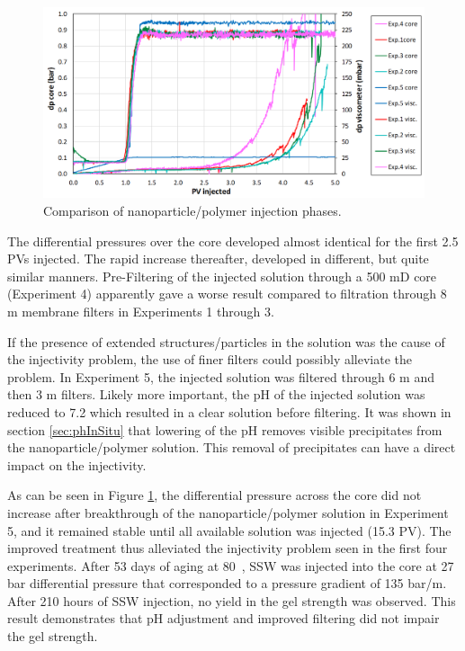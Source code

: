 \begin{figure}[h!]
    \centering
    \includegraphics[width=\textwidth]{img/cht/gelexp_sum.png}
    \caption{Comparison of nanoparticle/polymer injection phases.}
    \label{cht:gelexp_sum} %
\end{figure}
 
The differential pressures over the core developed almost identical for the first 2.5 PVs injected. The rapid increase thereafter, developed in different, but quite similar manners. Pre-Filtering of the injected solution through a 500 mD core (Experiment 4) apparently gave a worse result compared to filtration through 8 \micro m membrane filters in Experiments 1 through 3.

If the presence of extended structures/particles in the solution was the cause of the injectivity problem, the use of finer filters could possibly alleviate the problem. In Experiment 5, the injected solution was filtered through 6 \micro m and then 3 \micro m filters. Likely more important, the pH of the injected solution was reduced to 7.2 which resulted in a clear solution before filtering. It was shown in section \ref{sec:phInSitu} that lowering of the pH removes visible precipitates from the nanoparticle/polymer solution. This removal of precipitates can have a direct impact on the injectivity. 

As can be seen in Figure \ref{cht:gelexp_sum}, the differential pressure across the core did not increase after breakthrough of the nanoparticle/polymer solution in Experiment 5, and it remained stable until all available solution was injected (15.3 PV). The improved treatment thus alleviated the injectivity problem seen in the first four experiments. After 53 days of aging at 80~\celsius, SSW was injected into the core at 27 bar differential pressure that corresponded to a pressure gradient of 135 bar/m. After 210 hours of SSW injection, no yield in the gel strength was observed. This result demonstrates that pH adjustment and improved filtering did not impair the gel strength.

